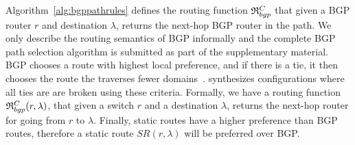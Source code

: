  \iffull
Algorithm~\ref{alg:bgppathrules} defines the routing function 
$\mathfrak{R}_{bgp}^C$ 
that given 
a BGP router $r$
and destination  
$\lambda$,
returns 
the next-hop BGP router in the path. 
\else
We only describe the routing semantics of BGP
informally and the complete BGP path selection algorithm is submitted as part of the supplementary material.
\fi
BGP 
chooses a route with highest local preference, and
if there is a tie, it then chooses the route the traverses fewer domains~\cite{bgp}. 
\name synthesizes configurations where all ties are 
are broken using these criteria. Formally, we have a routing function 
$\mathfrak{R}_{bgp}^C(r,\lambda)$, that given a switch $r$ and a destination $\lambda$,
returns the next-hop router for going from $r$ to $\lambda$. 
Finally, static routes 
have a higher preference than BGP routes, therefore a static route
$SR(r, \lambda)$ will be preferred over BGP.

